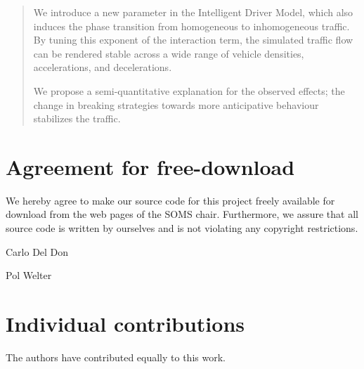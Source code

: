 




\begin{abstract}
We introduce a new parameter in the Intelligent Driver Model, which also induces the phase transition from homogeneous to inhomogeneous traffic. By tuning this exponent of the interaction term, the simulated traffic flow can be rendered stable across a wide range of vehicle densities, accelerations, and decelerations.

We propose a semi-quantitative explanation for the observed effects; the change in breaking strategies towards more anticipative  behaviour stabilizes the traffic.
\end{abstract}
\newpage


\newpage
\section*{Agreement for free-download}
\bigskip\bigskip
\large We hereby agree to make our source code for this project freely available for download from the web pages of the SOMS chair. Furthermore, we assure that all source code is written by ourselves and is not violating any copyright restrictions.

\begin{minipage}[t][2cm][b]{0.45\textwidth}
    \centering Carlo Del Don
\end{minipage}
\begin{minipage}[t][2cm][b]{0.45\textwidth}
    \centering Pol Welter
\end{minipage}

\vspace{5cm}
\section*{Individual contributions}
\bigskip\bigskip
The authors have contributed equally to this work.

\newpage

\tableofcontents

\newpage









\clearpage




\cleardoublepage





  



 
